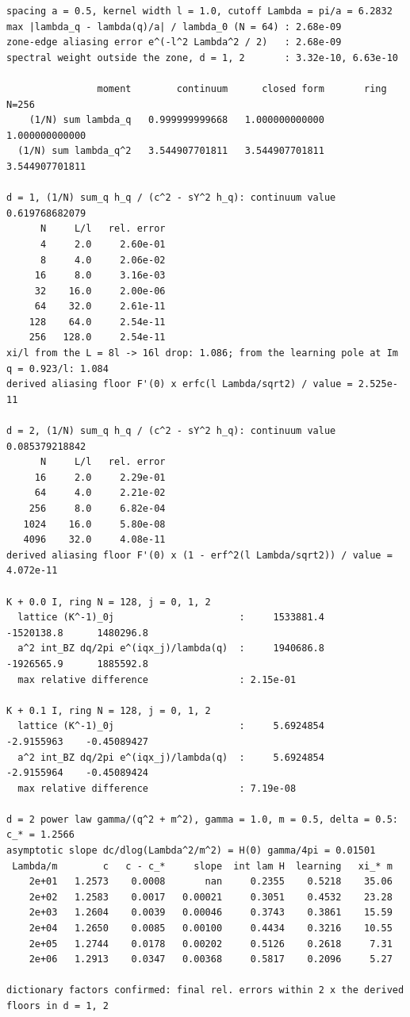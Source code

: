 \documentclass[11pt,a4paper]{article}
\begin{document}
{\footnotesize
\begin{verbatim}
spacing a = 0.5, kernel width l = 1.0, cutoff Lambda = pi/a = 6.2832
max |lambda_q - lambda(q)/a| / lambda_0 (N = 64) : 2.68e-09
zone-edge aliasing error e^(-l^2 Lambda^2 / 2)   : 2.68e-09
spectral weight outside the zone, d = 1, 2       : 3.32e-10, 6.63e-10

                moment        continuum      closed form       ring N=256
    (1/N) sum lambda_q   0.999999999668   1.000000000000   1.000000000000
  (1/N) sum lambda_q^2   3.544907701811   3.544907701811   3.544907701811

d = 1, (1/N) sum_q h_q / (c^2 - sY^2 h_q): continuum value 0.619768682079
      N     L/l   rel. error
      4     2.0     2.60e-01
      8     4.0     2.06e-02
     16     8.0     3.16e-03
     32    16.0     2.00e-06
     64    32.0     2.61e-11
    128    64.0     2.54e-11
    256   128.0     2.54e-11
xi/l from the L = 8l -> 16l drop: 1.086; from the learning pole at Im q = 0.923/l: 1.084
derived aliasing floor F'(0) x erfc(l Lambda/sqrt2) / value = 2.525e-11

d = 2, (1/N) sum_q h_q / (c^2 - sY^2 h_q): continuum value 0.085379218842
      N     L/l   rel. error
     16     2.0     2.29e-01
     64     4.0     2.21e-02
    256     8.0     6.82e-04
   1024    16.0     5.80e-08
   4096    32.0     4.08e-11
derived aliasing floor F'(0) x (1 - erf^2(l Lambda/sqrt2)) / value = 4.072e-11

K + 0.0 I, ring N = 128, j = 0, 1, 2
  lattice (K^-1)_0j                      :     1533881.4     -1520138.8      1480296.8
  a^2 int_BZ dq/2pi e^(iqx_j)/lambda(q)  :     1940686.8     -1926565.9      1885592.8
  max relative difference                : 2.15e-01

K + 0.1 I, ring N = 128, j = 0, 1, 2
  lattice (K^-1)_0j                      :     5.6924854     -2.9155963    -0.45089427
  a^2 int_BZ dq/2pi e^(iqx_j)/lambda(q)  :     5.6924854     -2.9155964    -0.45089424
  max relative difference                : 7.19e-08

d = 2 power law gamma/(q^2 + m^2), gamma = 1.0, m = 0.5, delta = 0.5: c_* = 1.2566
asymptotic slope dc/dlog(Lambda^2/m^2) = H(0) gamma/4pi = 0.01501
 Lambda/m        c   c - c_*     slope  int lam H  learning   xi_* m
    2e+01   1.2573    0.0008       nan     0.2355    0.5218    35.06
    2e+02   1.2583    0.0017   0.00021     0.3051    0.4532    23.28
    2e+03   1.2604    0.0039   0.00046     0.3743    0.3861    15.59
    2e+04   1.2650    0.0085   0.00100     0.4434    0.3216    10.55
    2e+05   1.2744    0.0178   0.00202     0.5126    0.2618     7.31
    2e+06   1.2913    0.0347   0.00368     0.5817    0.2096     5.27

dictionary factors confirmed: final rel. errors within 2 x the derived floors in d = 1, 2
\end{verbatim}
}
\end{document}

